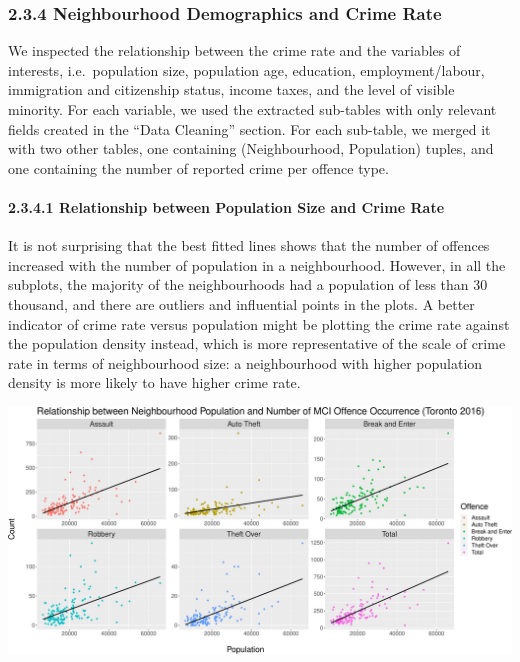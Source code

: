 \documentclass[
]{article}
\begin{document}
\hypertarget{neighbourhood-demographics-and-crime-rate}{%
\subsubsection{2.3.4 Neighbourhood Demographics and Crime
Rate}\label{neighbourhood-demographics-and-crime-rate}}

We inspected the relationship between the crime rate and the variables
of interests, i.e.~population size, population age, education,
employment/labour, immigration and citizenship status, income taxes, and
the level of visible minority. For each variable, we used the extracted
sub-tables with only relevant fields created in the ``Data Cleaning''
section. For each sub-table, we merged it with two other tables, one
containing (Neighbourhood, Population) tuples, and one containing the
number of reported crime per offence type.

\hypertarget{relationship-between-population-size-and-crime-rate}{%
\paragraph{2.3.4.1 Relationship between Population Size and Crime
Rate}\label{relationship-between-population-size-and-crime-rate}}

It is not surprising that the best fitted lines shows that the number of
offences increased with the number of population in a neighbourhood.
However, in all the subplots, the majority of the neighbourhoods had a
population of less than 30 thousand, and there are outliers and
influential points in the plots. A better indicator of crime rate versus
population might be plotting the crime rate against the population
density instead, which is more representative of the scale of crime rate
in terms of neighbourhood size: a neighbourhood with higher population
density is more likely to have higher crime rate.

\includegraphics{Final-Report_files/figure-latex/crime-vs-population-2-1.pdf}
\end{document}
